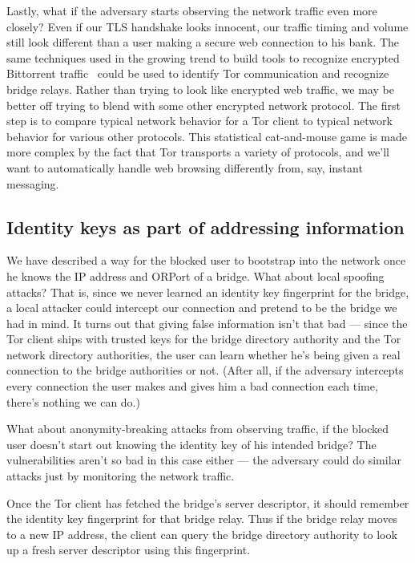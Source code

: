 \documentclass{llncs}
\begin{document}
Lastly, what if the adversary starts observing the network traffic even
more closely? Even if our TLS handshake looks innocent, our traffic timing
and volume still look different than a user making a secure web connection
to his bank. The same techniques used in the growing trend to build tools
to recognize encrypted Bittorrent traffic~\cite{bt-traffic-shaping}
could be used to identify Tor communication and recognize bridge
relays. Rather than trying to look like encrypted web traffic, we may be
better off trying to blend with some other encrypted network protocol. The
first step is to compare typical network behavior for a Tor client to
typical network behavior for various other protocols. This statistical
cat-and-mouse game is made more complex by the fact that Tor transports a
variety of protocols, and we'll want to automatically handle web browsing
differently from, say, instant messaging.

\subsection{Identity keys as part of addressing information}

We have described a way for the blocked user to bootstrap into the
network once he knows the IP address and ORPort of a bridge. What about
local spoofing attacks? That is, since we never learned an identity
key fingerprint for the bridge, a local attacker could intercept our
connection and pretend to be the bridge we had in mind. It turns out
that giving false information isn't that bad --- since the Tor client
ships with trusted keys for the bridge directory authority and the Tor
network directory authorities, the user can learn whether he's being
given a real connection to the bridge authorities or not. (After all,
if the adversary intercepts every connection the user makes and gives
him a bad connection each time, there's nothing we can do.)

What about anonymity-breaking attacks from observing traffic, if the
blocked user doesn't start out knowing the identity key of his intended
bridge? The vulnerabilities aren't so bad in this case either ---
the adversary could do similar attacks just by monitoring the network
traffic.

Once the Tor client has fetched the bridge's server descriptor, it should
remember the identity key fingerprint for that bridge relay. Thus if
the bridge relay moves to a new IP address, the client can query the
bridge directory authority to look up a fresh server descriptor using
this fingerprint.
\end{document}

